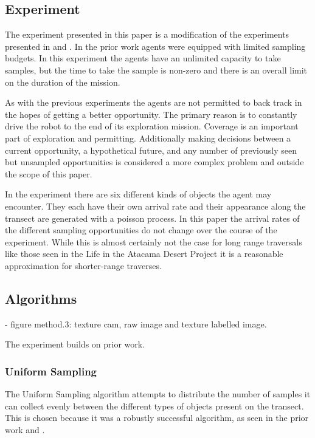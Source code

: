 \subsection{Experiment}

The experiment presented in this paper is a modification of the experiments
presented in \cite{furlong2014sequential} and \cite{furlong2014budgeting}.  In the
prior work agents were equipped with limited sampling budgets.  In this
experiment the agents have an unlimited capacity to take samples, but the time
to take the sample is non-zero and there is an overall limit on the duration of
the mission.

As with the previous experiments the agents are not permitted to back track in
the hopes of getting a better opportunity.  The primary reason is to constantly
drive the robot to the end of its exploration mission.  Coverage is an
important part of exploration and permitting.  Additionally making decisions
between a current opportunity, a hypothetical future, and any number of
previously seen but unsampled opportunities is considered a more complex
problem and outside the scope of this paper.

In the experiment there are six different kinds of objects the agent may
encounter.  They each have their own arrival rate and their appearance along
the transect are generated with a poisson process.  In this paper the arrival
rates of the different sampling opportunities do not change over the course of
the experiment.  While this is almost certainly not the case for long range
traversals like those seen in the Life in the Atacama Desert Project it is a
reasonable approximation for shorter-range traverses.

\subsection{Algorithms}

	- figure method.3: texture cam, raw image and texture labelled image.

	The experiment builds on prior work.  

\subsubsection{Uniform Sampling}

The Uniform Sampling algorithm attempts to distribute the number of samples it
can collect evenly between the different types of objects present on the
transect.  This is chosen because it was a robustly successful algorithm, as
seen in the prior work \cite{furlong2014sequential} and \cite{furlong2014isairas}.

